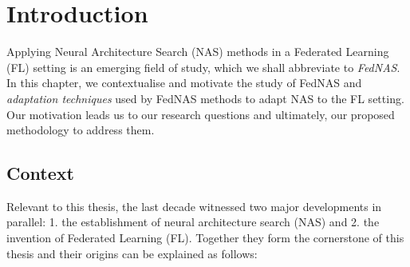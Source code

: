 \chapter{Introduction}\label{chapter:introduction}

Applying Neural Architecture Search (NAS) methods in a Federated Learning (FL) setting is an emerging field of study, which we shall abbreviate to \textit{FedNAS}. In this chapter, we contextualise and motivate the study of FedNAS and \textit{adaptation techniques} used by FedNAS methods to adapt NAS to the FL setting. Our motivation leads us to our research questions and ultimately, our proposed methodology to address them.

\section{Context}

Relevant to this thesis, the last decade witnessed two major developments in parallel: 1. the establishment of neural architecture search (NAS) and 2. the invention of Federated Learning (FL). Together they form the cornerstone of this thesis and their origins can be explained as follows:

